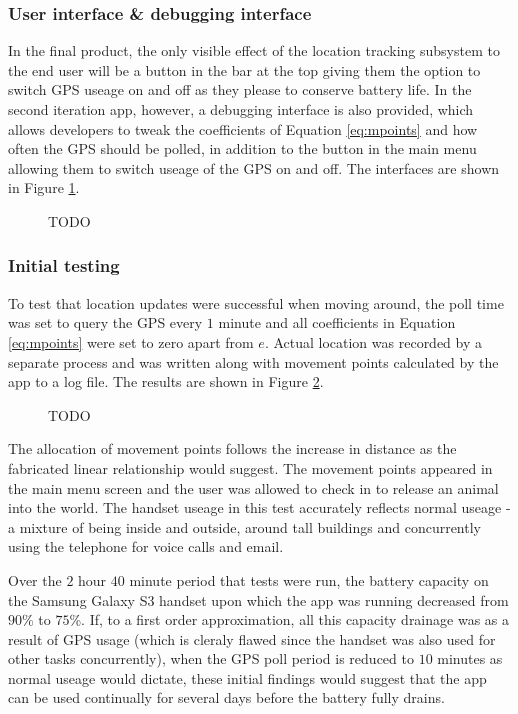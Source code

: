 \documentclass[12pt,a4paper,twoside]{article}
\begin{document}
\subsubsection{User interface \& debugging interface}
In the final product, the only visible effect of the location tracking subsystem to the end user will be a button in the bar at the top giving them the option to switch GPS useage on and off as they please to conserve battery life. In the second iteration app, however, a debugging interface is also provided, which allows developers to tweak the coefficients of Equation \ref{eq:mpoints} and how often the GPS should be polled, in addition to the button in the main menu allowing them to switch useage of the GPS on and off. The interfaces are shown in Figure \ref{fig:gpsinterface}.

\begin{figure}
\label{fig:gpsinterface}

\caption{TODO}
\end{figure}

\subsubsection{Initial testing}
To test that location updates were successful when moving around, the poll time was set to query the GPS every $1$ minute and all coefficients in Equation \ref{eq:mpoints} were set to zero apart from $e$. Actual location was recorded by a separate process and was written along with movement points calculated by the app to a log file. The results are shown in Figure \ref{fig:gpstestresults}.

\begin{figure}
\label{fig:gpstestresults}

\caption{TODO}
\end{figure}

The allocation of movement points follows the increase in distance as the fabricated linear relationship would suggest. The movement points appeared in the main menu screen and the user was allowed to check in to release an animal into the world. The handset useage in this test accurately reflects normal useage - a mixture of being inside and outside, around tall buildings and concurrently using the telephone for voice calls and email.

Over the $2$ hour $40$ minute period that tests were run, the battery capacity on the Samsung Galaxy S3 handset upon which the app was running decreased from $90$\% to $75$\%. If, to a first order approximation, all this capacity drainage was as a result of GPS usage (which is cleraly flawed since the handset was also used for other tasks concurrently), when the GPS poll period is reduced to $10$ minutes as normal useage would dictate, these initial findings would suggest that the app can be used continually for several days before the battery fully drains.
\end{document}
